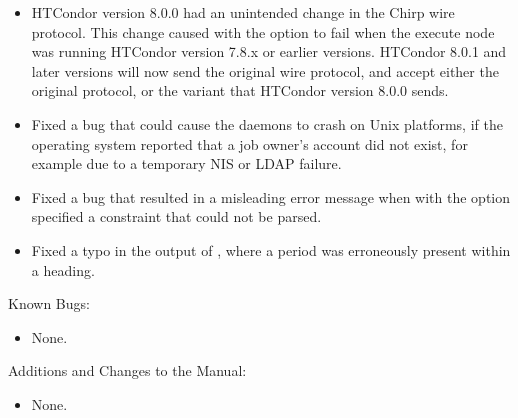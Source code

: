 \begin{itemize}

\item HTCondor version 8.0.0 had an unintended change in the Chirp 
wire protocol.
This change caused  with the  option
to fail when the execute node
was running HTCondor version 7.8.x or earlier versions. 
HTCondor 8.0.1 and later
versions will now send the original wire protocol, and accept either the
original protocol, or the variant that HTCondor version 8.0.0 sends.

\item Fixed a bug that could cause the daemons to crash on Unix platforms,
if the operating system reported that a job owner's account 
did not exist, for example due to a temporary NIS or LDAP failure.

\item Fixed a bug that resulted in a misleading error message when
 with the  option specified a constraint 
that could not be parsed.

\item Fixed a typo in the output of ,
where a period was erroneously present within a heading.

\end{itemize}

\noindent Known Bugs:

\begin{itemize}

\item None.

\end{itemize}

\noindent Additions and Changes to the Manual:

\begin{itemize}

\item None.

\end{itemize}


